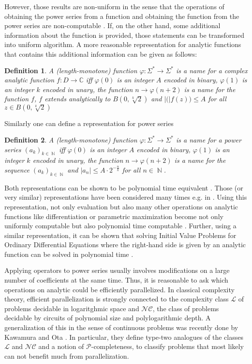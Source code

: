 \documentclass{article}
\newcommand{\CC}{\mathbb C}
\DeclareMathOperator{\NN}{\mathbb N}
\newcommand{\abs}[1]{\left|#1\right|}
\newcommand{\p}{\ensuremath{\mathcal P}\xspace}
\newcommand{\cl}{\ensuremath{\mathcal{L}}\xspace}
\newcommand{\nc}{\ensuremath{\mathcal{NC}}\xspace}
\newtheorem{definition}{Definition}
\begin{document}
However, those results are non-uniform in the sense that the operations of obtaining the power series from a function and obtaining the function from the power series are non-computable \cite{Mueller87}.
If, on the other hand, some additional information about the function is provided, those statements can be transformed into uniform algorithm.
A more reasonable representation for analytic functions that contains this additional information can be given as follows: 
\begin{definition}\label{def:function}
  A (length-monotone) function $\varphi: \Sigma^* \to \Sigma^*$ is a name for a complex analytic function $f:D \to \CC$ iff
  $\varphi(0)$ is an integer $A$ encoded in binary,
  $\varphi(1)$ is an integer $k$ encoded in unary,
  the function $n \to \varphi(n+2)$ is a name for the function $f$,
  $f$ extends analytically to $B(0, \sqrt[k]{2})$ and
  $\abs(f(z)) \leq A$ for all $z \in B(0, \sqrt[k]{2})$

\end{definition}
Similarly one can define a representation for power series 
\begin{definition}\label{def:powerseries}
  A (length-monotone) function $\varphi: \Sigma^* \to \Sigma^*$ is a name for a power series $(a_k)_{k \in \NN}$ iff
  $\varphi(0)$ is an integer $A$ encoded in binary,
  $\varphi(1)$ is an integer $k$ encoded in unary,
  the function $n \to \varphi(n+2)$ is a name for the sequence $(a_k)_{k \in \NN}$ and
  $\abs{a_n} \leq A \cdot 2^{-\frac{n}{k}}$ for all $n \in \NN$.
\end{definition}
Both representations can be shown to be polynomial time equivalent \cite{Kawamura2012}.
Those (or very similar) representations have been considered many times e.g. in \cite{Mueller95, Kawamura2012,DBLP:journals/corr/PaulyS15,DBLP:journals/jsc/Hoeven05}.
Using this representation, not only evaluation but also many other operations on analytic functions like differentiation or parametric maximization become not only uniformly computable but also polynomial time computable \cite{Kawamura2012}.
Further, using a similar representation, it can be shown that solving Initial Value Problems for Ordinary Differential Equations where the right-hand side is given by an analytic function can be solved in polynomial time \cite{moiske1993solving}.

Applying operators to power series usually involves modifications on a large number of coefficients at the same time.
Thus, it is reasonable to ask which operations on analytic could be efficiently parallelized.
In classical complexity theory, efficient parallelization is strongly connected to the complexity class \cl of problems decidable in logaritghmic space and \nc, the class of problems decidable by circuits of polynomial size and polylogarithmic depth.
A generalization of this in the sense of continuous problems was recently done by Kawamura and Ota \cite{Kawamura2014}.
In particular, they define type-two analogues of the classes \cl and \nc and a notion of \p-completeness, to classify problems that most likely can not benefit much from parallelization.
\end{document}

